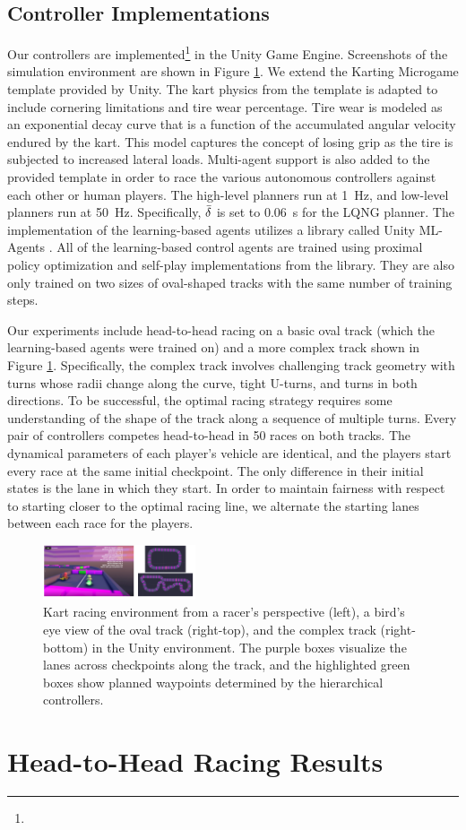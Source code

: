 \subsection{Controller Implementations}
Our controllers are implemented\footnote{\codeurl} in the Unity Game Engine. Screenshots of the simulation environment are shown in Figure \ref{fig:experiment_tracks}. We extend the Karting Microgame template \cite{microkarting} provided by Unity. The kart physics from the template is adapted to include cornering limitations and tire wear percentage. Tire wear is modeled as an exponential decay curve that is a function of the accumulated angular velocity endured by the kart. This model captures the concept of losing grip as the tire is subjected to increased lateral loads. Multi-agent support is also added to the provided template in order to race the various autonomous controllers against each other or human players. The high-level planners run at \SI{1}{\hertz}, and low-level planners run at \SI{50}{\hertz}. Specifically, $\Bar{\delta}$ is set to \SI{0.06}{\second} for the LQNG planner. The implementation of the learning-based agents utilizes a library called Unity ML-Agents \cite{mlagents}. All of the learning-based control agents are trained using proximal policy optimization and self-play implementations from the library. They are also only trained on two sizes of oval-shaped tracks with the same number of training steps. 

Our experiments include head-to-head racing on a basic oval track (which the learning-based agents were trained on) and a more complex track shown in Figure \ref{fig:experiment_tracks}. Specifically, the complex track involves challenging track geometry with turns whose radii change along the curve, tight U-turns, and turns in both directions. To be successful, the optimal racing strategy requires some understanding of the shape of the track along a sequence of multiple turns. Every pair of controllers competes head-to-head in 50 races on both tracks. The dynamical parameters of each player's vehicle are identical, and the players start every race at the same initial checkpoint. The only difference in their initial states is the lane in which they start. In order to maintain fairness with respect to starting closer to the optimal racing line, we alternate the starting lanes between each race for the players.
\begin{figure}
  \centering
  \includegraphics[width=0.4\textwidth]{Figures/UnityEnvironment.png}
  \caption{Kart racing environment from a racer's perspective (left), a bird's eye view of the oval track (right-top), and the complex track (right-bottom) in the Unity environment. The purple boxes visualize the lanes across checkpoints along the track, and the highlighted green boxes show planned waypoints determined by the hierarchical controllers.}
  \label{fig:experiment_tracks}
\end{figure}
\section{Head-to-Head Racing Results}
